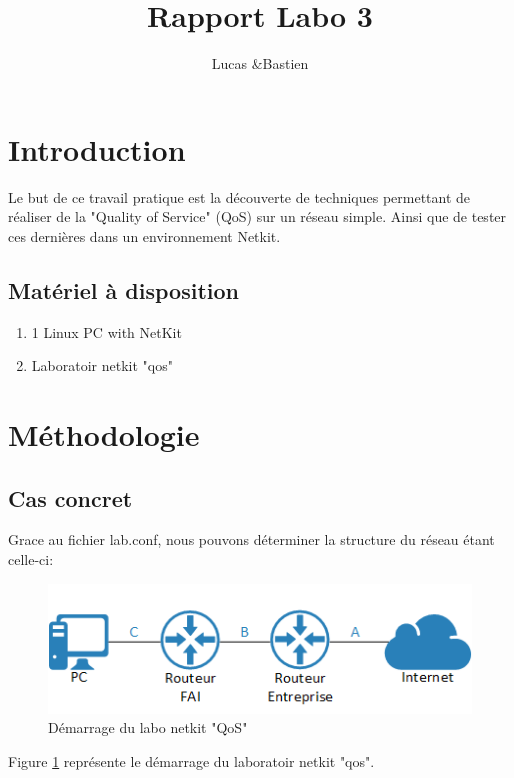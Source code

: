 \documentclass{article}
\title{Rapport Labo 3}
\author{Lucas \bsc{Bulloni} \&Bastien \bsc{Wermeille}}
\begin{document}
\maketitle

 

\section{Introduction}
 Le but de ce travail pratique est la découverte de techniques permettant de réaliser de la "Quality of Service" (QoS) sur un réseau simple. Ainsi que de tester ces dernières dans un environnement Netkit.

\subsection{Matériel à disposition}
\begin{enumerate}
\item 1 Linux PC with NetKit
\item Laboratoir netkit "qos"
\end{enumerate}

\section{Méthodologie}


\subsection{Cas concret}
Grace au fichier lab.conf, nous pouvons déterminer la structure du réseau étant celle-ci:
\begin{figure}
  \includegraphics[width=\linewidth]{./structure.png}
  \caption{Démarrage du labo netkit "QoS"}
  \label{fig:qos}
\end{figure}

Figure \ref{fig:qos} représente le démarrage du laboratoir netkit "qos".
\end{document}
